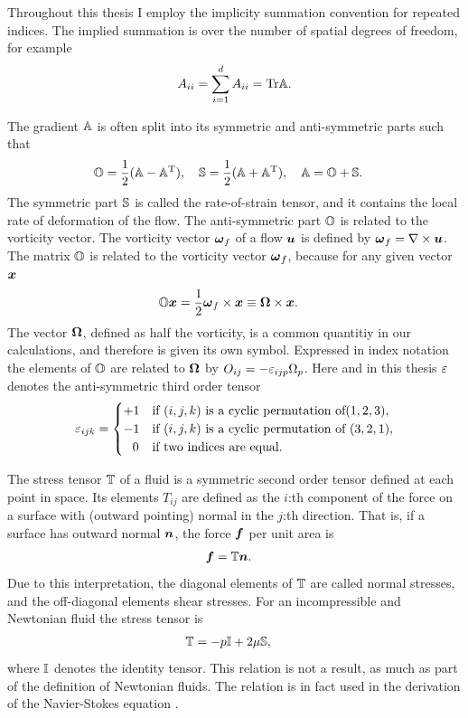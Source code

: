 \documentclass[thesis.tex]{subfiles}
\begin{document}
Throughout this thesis I employ the implicity summation convention for repeated indices. The implied summation is over the number of spatial degrees of freedom, for example
\begin{align*}
	A_{ii} = \sum_{i=1}^d A_{ii} = \mbox{Tr} \mathbb{A}.
\end{align*}

The gradient $\mathbb{A}$ is often split into its symmetric and anti-symmetric parts such that
\begin{align*}
	&\mathbb{O} = \frac{1}{2}(\mathbb{A} - \mathbb{A}^{\mathrm T}),\quad
	\mathbb{S} = \frac{1}{2}(\mathbb{A} + \mathbb{A}^{\mathrm T}),\quad
	\mathbb{A} = \mathbb{O} + \mathbb{S}.
\end{align*}
The symmetric part $\mathbb{S}$ is called the rate-of-strain tensor, and it contains the local rate of deformation of the flow. The anti-symmetric part $\mathbb{O}$ is related to the vorticity vector. The vorticity vector $\mbox{\boldmath$\omega$}_f$ of a flow $\mbox{\boldmath$u$}$ is defined by $\mbox{\boldmath$\omega$}_f = \nabla \times \mbox{\boldmath$u$}$. The matrix $\mathbb{O}$ is related to the vorticity vector $\mbox{\boldmath$\omega$}_f$, because for any given vector $\mbox{\boldmath$x$}$
\begin{align}
	\ma O \ve x &= \frac{1}{2}\ve \omega_f \cross \ve x \equiv \ve \Omega \cross \ve x.\eqnlab{vorticityOdef}
\end{align}
The vector $\mbox{\boldmath$\Omega$}$, defined as half the vorticity, is a common quantitiy in our calculations, and therefore is given its own symbol. Expressed in index notation the elements of $\mathbb{O}$ are related to $\mbox{\boldmath$\Omega$}$ by $O_{ij} = -\varepsilon_{ijp}\Omega_p$. Here and in this thesis $\varepsilon$ denotes the anti-symmetric third order tensor
\begin{align*}
\varepsilon_{ijk} = \begin{cases}
+1 & \textrm{if } (i,j,k) \textrm{ is a cyclic permutation of} (1,2,3), \\
-1 & \textrm{if } (i,j,k) \textrm{ is a cyclic permutation of } (3,2,1), \\
\;\;\,0 & \textrm{if two indices are equal.}
\end{cases}\end{align*}

The stress tensor $\mathbb{T}$ of a fluid is a symmetric second order tensor defined at each point in space. Its elements $T_{ij}$ are defined as the $i$:th component of the force on a surface with (outward pointing) normal in the $j$:th direction. That is, if a surface has outward normal $\mbox{\boldmath$n$}$, the force $\mbox{\boldmath$f$}$ per unit area is
\begin{align*}
	\mbox{\boldmath$f$} &= \mathbb{T} \mbox{\boldmath$n$}.
\end{align*}
Due to this interpretation, the diagonal elements of $\mathbb{T}$ are called normal stresses, and the off-diagonal elements shear stresses. For an incompressible and Newtonian fluid the stress tensor is
\begin{align*}
	\mathbb{T} &= -p \mathbb{I} + 2\mu \mathbb{S},
\end{align*}
where $\mathbb{I}$ denotes the identity tensor. This relation is not a result, as much as part of the definition of Newtonian fluids. The relation is in fact used in the derivation of the Navier-Stokes equation  \cite{kundu2004}. 
\end{document}
